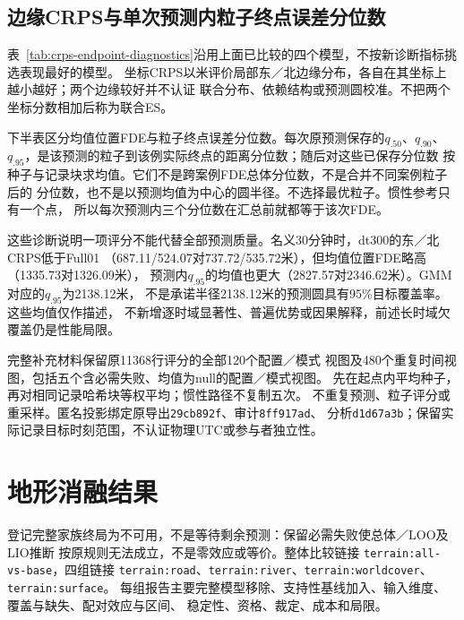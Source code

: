 \documentclass[UTF8,11pt]{ctexart}
\begin{document}



\subsection{边缘CRPS与单次预测内粒子终点误差分位数}
\label{sec:secondary-score-diagnostics}
表~\ref{tab:crps-endpoint-diagnostics}沿用上面已比较的四个模型，不按新诊断指标挑选表现最好的模型。
坐标CRPS以米评价局部东／北边缘分布，各自在其坐标上越小越好；两个边缘较好并不认证
联合分布、依赖结构或预测圆校准。不把两个坐标分数相加后称为联合ES。

下半表区分均值位置FDE与粒子终点误差分位数。每次原预测保存的$q_{.50}$、$q_{.90}$、
$q_{.95}$，是该预测的粒子到该例实际终点的距离分位数；随后对这些已保存分位数
按种子与记录块求均值。它们不是跨案例FDE总体分位数，不是合并不同案例粒子后的
分位数，也不是以预测均值为中心的圆半径。不选择最优粒子。惯性参考只有一个点，
所以每次预测内三个分位数在汇总前就都等于该次FDE。

这些诊断说明一项评分不能代替全部预测质量。名义30分钟时，dt300的东／北CRPS低于Full01
（687.11/524.07对737.72/535.72米），但均值位置FDE略高（1335.73对1326.09米），
预测内$q_{.95}$的均值也更大（2827.57对2346.62米）。GMM对应的$q_{.95}$为2138.12米，
不是承诺半径2138.12米的预测圆具有95\%目标覆盖率。这些均值仅作描述，
不新增逐时域显著性、普遍优势或因果解释，前述长时域欠覆盖仍是性能局限。

完整补充材料保留原11368行评分的全部120个配置／模式
视图及480个重复时间视图，包括五个含必需失败、均值为null的配置／模式视图。
先在起点内平均种子，再对相同记录哈希块等权平均；惯性路径不复制五次。
不重复预测、粒子评分或重采样。匿名投影绑定原导出\texttt{29cb892f}、审计\texttt{8ff917ad}、
分析\texttt{d1d67a3b}；保留实际记录目标时刻范围，不认证物理UTC或参与者独立性。


\section{地形消融结果}
\label{sec:terrain-results}
登记完整家族终局为不可用，不是等待剩余预测：保留必需失败使总体／LOO及LIO推断
按原规则无法成立，不是零效应或等价。整体比较链接 \texttt{terrain:all-vs-base}，四组链接
\texttt{terrain:road}、\texttt{terrain:river}、\texttt{terrain:worldcover}、\texttt{terrain:surface}。
每组报告主要完整模型移除、支持性基线加入、输入维度、覆盖与缺失、配对效应与区间、
稳定性、资格、裁定、成本和局限。
\end{document}
